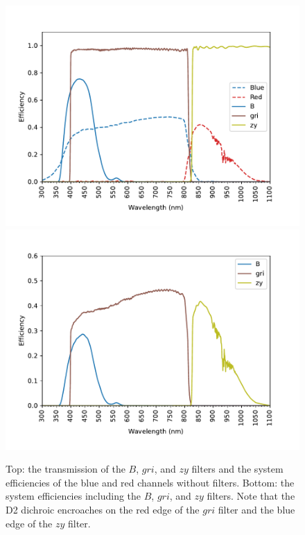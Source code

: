 \begin{figure}
\centering
\includegraphics[width=0.80\linewidth]{figure/filters-1.pdf}
\includegraphics[width=0.80\linewidth]{figure/system-filters-1.pdf}
\caption{Top: the transmission of the $B$, $gri$, and $zy$ filters and the system efficiencies of the blue and red channels without filters. Bottom: the system efficiencies including the $B$, $gri$, and $zy$ filters. Note that the D2 dichroic encroaches on the red edge of the $gri$ filter and the blue edge of the $zy$ filter.}
\label{figure:system-filters-others}
\end{figure}

